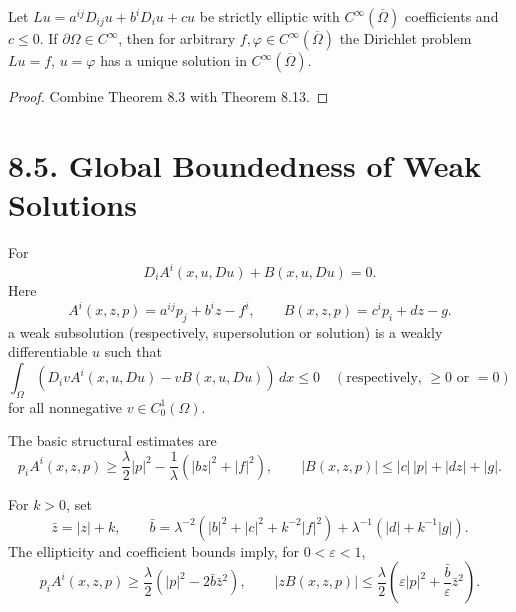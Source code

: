 \begin{theorem}
\label{gt-thm-8-14-smooth-classical-dirichlet}
Let $Lu=a^{ij}D_{ij}u+b^iD_iu+cu$ be strictly elliptic with
$C^\infty(\overline\Omega)$ coefficients and $c\leq0$. If
$\partial\Omega\in C^\infty$, then for arbitrary
$f,\varphi\in C^\infty(\overline\Omega)$ the Dirichlet problem
$Lu=f$, $u=\varphi$ has a unique solution in $C^\infty(\overline\Omega)$.
\end{theorem}
\begin{proof}
\sketch Combine Theorem 8.3 with Theorem 8.13.
\end{proof}

\section*{8.5. Global Boundedness of Weak Solutions}

For
\begin{equation}
D_iA^i(x,u,Du)+B(x,u,Du)=0.
\tag{8.28}
\end{equation}
Here
\begin{equation}
A^i(x,z,p)=a^{ij}p_j+b^iz-f^i,
\qquad B(x,z,p)=c^ip_i+dz-g.
\tag{8.29}
\end{equation}
a weak subsolution (respectively, supersolution or solution) is a weakly
differentiable $u$ such that
\begin{equation}
\int_\Omega(D_ivA^i(x,u,Du)-vB(x,u,Du))\,dx\leq0
\quad(\text{respectively, }\geq0\text{ or }=0)
\tag{8.30}
\end{equation}
for all nonnegative $v\in C_0^1(\Omega)$.

The basic structural estimates are
\begin{equation}
p_iA^i(x,z,p)\geq\frac\lambda2|p|^2
-\frac1\lambda(|bz|^2+|f|^2),
\qquad
|B(x,z,p)|\leq|c|\,|p|+|dz|+|g|.
\tag{8.31}
\end{equation}

For $k>0$, set
\begin{equation}
\bar z=|z|+k,
\qquad
\bar b=\lambda^{-2}(|b|^2+|c|^2+k^{-2}|f|^2)
 +\lambda^{-1}(|d|+k^{-1}|g|).
\tag{8.32}
\end{equation}
The ellipticity and coefficient bounds imply, for $0<\varepsilon<1$,
\begin{equation}
p_iA^i(x,z,p)\geq\frac\lambda2(|p|^2-2\bar b\bar z^2),
\qquad
|zB(x,z,p)|\leq\frac\lambda2
\left(\varepsilon|p|^2+\frac{\bar b}{\varepsilon}\bar z^2\right).
\tag{8.33}
\end{equation}

